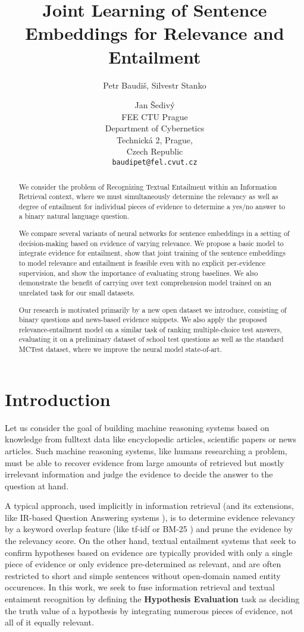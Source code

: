 \documentclass[11pt]{article}
\title{Joint Learning of Sentence Embeddings for Relevance and Entailment}
\author{Petr Baudi\v{s},
	Silvestr Stanko \and
	Jan \v{S}ediv\'{y} \\
	FEE CTU Prague\\
	Department of Cybernetics\\
	Technick\'{a} 2, Prague,\\Czech Republic\\
	{\tt baudipet@fel.cvut.cz}}
\date{}
\begin{document}
\maketitle

\begin{abstract}
	We consider the problem of Recognizing Textual Entailment
	within an Information Retrieval context, where we must simultaneously
	determine the relevancy as well as degree of entailment for individual
	pieces of evidence to determine a yes/no answer to a binary
	natural language question.

	We compare several variants of neural networks for sentence embeddings
	in a setting of decision-making based on evidence of varying relevance.
	We propose a basic model to integrate evidence for entailment,
	show that joint training of the sentence embeddings to model
	relevance and entailment is feasible even with no explicit per-evidence
	supervision, and show the importance of evaluating strong baselines.
	We also demonstrate the benefit of carrying over text comprehension model
	trained on an unrelated task for our small datasets.

	Our research is motivated primarily by a new open dataset we introduce,
	consisting of binary questions and news-based evidence snippets.
	We also apply the proposed relevance-entailment model on a similar task
	of ranking multiple-choice test answers, evaluating it on
	a preliminary dataset of school test questions as well as
	the standard MCTest dataset, where we improve the neural model state-of-art.
\end{abstract}

\section{Introduction}

Let us consider the goal of building machine reasoning systems based
on knowledge from fulltext data like encyclopedic articles, scientific
papers or news articles.
Such machine reasoning systems, like humans researching a problem,
must be able to recover evidence from large amounts of retrieved
but mostly irrelevant information and judge the evidence to decide
the answer to the question at hand.

A typical approach, used implicitly in information retrieval
(and its extensions, like IR-based Question Answering systems \cite{YodaQAPoster2015}),
is to determine evidence relevancy by a keyword overlap feature (like tf-idf or BM-25 \cite{BM25})
and prune the evidence by the relevancy score.
On the other hand, textual entailment systems that seek to confirm hypotheses
based on evidence \cite{RTE1} \cite{SICK2014} \cite{SNLI}
are typically provided with only a single piece of evidence
or only evidence pre-determined as relevant, and are often restricted
to short and simple sentences without open-domain named entity occurences.
%
In this work, we seek to fuse information retrieval and textual entaiment
recognition by defining the \textbf{Hypothesis Evaluation} task
as deciding the truth value of a hypothesis by integrating numerous
pieces of evidence, not all of it equally relevant.
\end{document}
